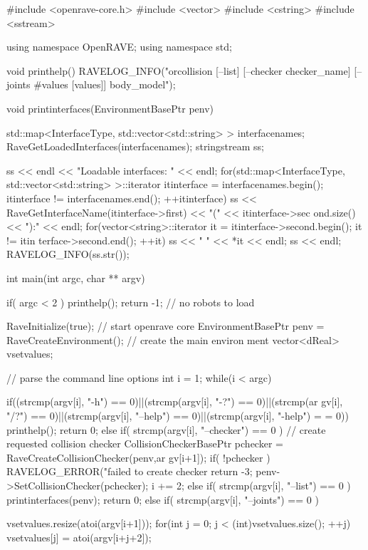 \begin{DoxyCodeInclude}

#include <openrave-core.h>
#include <vector>
#include <cstring>
#include <sstream>

using namespace OpenRAVE;
using namespace std;


void printhelp()
{
    RAVELOG_INFO("orcollision [--list] [--checker checker_name] [--joints #values
       [values]] body_model\n");
}

void printinterfaces(EnvironmentBasePtr penv)
{
    std::map<InterfaceType, std::vector<std::string> > interfacenames;
    RaveGetLoadedInterfaces(interfacenames);
    stringstream ss;

    ss << endl << "Loadable interfaces: " << endl;
    for(std::map<InterfaceType, std::vector<std::string> >::iterator itinterface 
      = interfacenames.begin(); itinterface != interfacenames.end(); ++itinterface) {
        ss << RaveGetInterfaceName(itinterface->first) << "(" << itinterface->sec
      ond.size() << "):" << endl;
        for(vector<string>::iterator it = itinterface->second.begin(); it != itin
      terface->second.end(); ++it)
            ss << " " << *it << endl;
        ss << endl;
    }
    RAVELOG_INFO(ss.str());
}

int main(int argc, char ** argv)
{
    if( argc < 2 ) {
        printhelp();
        return -1; // no robots to load
    }

    RaveInitialize(true); // start openrave core
    EnvironmentBasePtr penv = RaveCreateEnvironment(); // create the main environ
      ment
    vector<dReal> vsetvalues;

    // parse the command line options
    int i = 1;
    while(i < argc) {
        if((strcmp(argv[i], "-h") == 0)||(strcmp(argv[i], "-?") == 0)||(strcmp(ar
      gv[i], "/?") == 0)||(strcmp(argv[i], "--help") == 0)||(strcmp(argv[i], "-help") =
      = 0)) {
            printhelp();
            return 0;
        }
        else if( strcmp(argv[i], "--checker") == 0 ) {
            // create requested collision checker
            CollisionCheckerBasePtr pchecker = RaveCreateCollisionChecker(penv,ar
      gv[i+1]);
            if( !pchecker ) {
                RAVELOG_ERROR("failed to create checker %
                return -3;
            }
            penv->SetCollisionChecker(pchecker);
            i += 2;
        }
        else if( strcmp(argv[i], "--list") == 0 ) {
            printinterfaces(penv);
            return 0;
        }
        else if( strcmp(argv[i], "--joints") == 0 ) {
            vsetvalues.resize(atoi(argv[i+1]));
            for(int j = 0; j < (int)vsetvalues.size(); ++j)
                vsetvalues[j] = atoi(argv[i+j+2]);

}}}
\end{DoxyCodeInclude}
